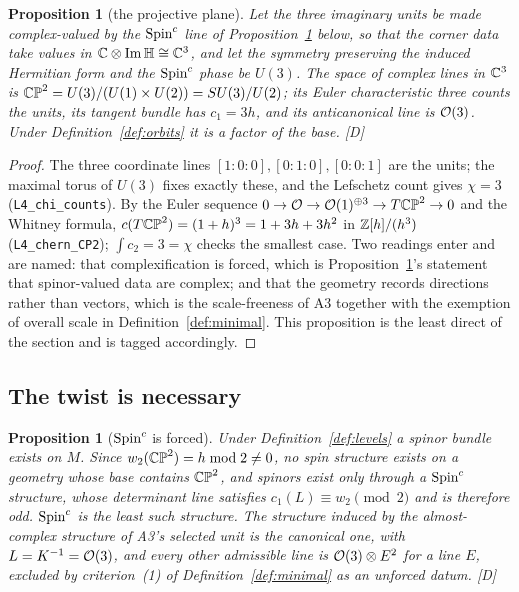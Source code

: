 \documentclass[11pt,a4paper]{article}
\theoremstyle{plain}
\newtheorem{proposition}[theorem]{Proposition}
\theoremstyle{definition}
\theoremstyle{remark}
\newcommand{\Hquat}{\mathbb{H}}
\newcommand{\ImH}{\operatorname{Im}\Hquat}
\newcommand{\rigD}{[\textup{D}]}
\begin{document}
\begin{proposition}[the projective plane]\label{prop:CP2}
Let the three imaginary units be made complex-valued by the $\text{Spin}^c$ line of Proposition~\ref{prop:spinc} below, so that the corner data take values in $\C\otimes\ImH\cong\C^{3}$, and let the symmetry preserving the induced Hermitian form and the $\text{Spin}^c$ phase be $U(3)$. The space of complex lines in $\mathbb{C}^{3}$ is $\mathbb{CP}^2=U(3)/(U(1)\times U(2))=SU(3)/U(2)$; its Euler characteristic three counts the units, its tangent bundle has $c_{1}=3h$, and its anticanonical line is $\mathcal{O}(3)$. Under Definition~\ref{def:orbits} it is a factor of the base. \rigD
\end{proposition}

\begin{proof}
The three coordinate lines $[1{:}0{:}0],[0{:}1{:}0],[0{:}0{:}1]$ are the units; the maximal torus of $U(3)$ fixes exactly these, and the Lefschetz count gives $\chi=3$ (\texttt{L4\_chi\_counts}). By the Euler sequence $0\to\mathcal{O}\to\mathcal{O}(1)^{\oplus3}\to T\mathbb{CP}^2\to0$ and the Whitney formula, $c(T\mathbb{CP}^2)=(1+h)^{3}=1+3h+3h^{2}$ in $\mathbb{Z}[h]/(h^{3})$ \cite{GriffithsHarris} (\texttt{L4\_chern\_CP2}); $\int c_{2}=3=\chi$ checks the smallest case. Two readings enter and are named: that complexification is forced, which is Proposition~\ref{prop:spinc}'s statement that spinor-valued data are complex; and that the geometry records directions rather than vectors, which is the scale-freeness of A3 together with the exemption of overall scale in Definition~\ref{def:minimal}. This proposition is the least direct of the section and is tagged accordingly.
\end{proof}

\subsection{The twist is necessary}

\begin{proposition}[$\text{Spin}^c$ is forced]\label{prop:spinc}
Under Definition~\ref{def:levels} a spinor bundle exists on $M$. Since $w_{2}(\mathbb{CP}^2)=h\bmod2\neq0$, no spin structure exists on a geometry whose base contains $\mathbb{CP}^2$, and spinors exist only through a $\text{Spin}^c$ structure, whose determinant line satisfies $c_{1}(L)\equiv w_{2}\pmod2$ and is therefore odd. $\text{Spin}^c$ is the least such structure. The structure induced by the almost-complex structure of A3's selected unit is the canonical one, with $L=K^{-1}=\mathcal{O}(3)$, and every other admissible line is $\mathcal{O}(3)\otimes E^{2}$ for a line $E$, excluded by criterion~(1) of Definition~\ref{def:minimal} as an unforced datum. \rigD
\end{proposition}
\end{document}
